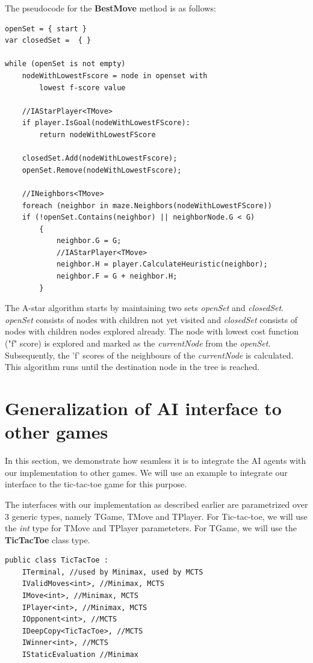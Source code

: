 The pseudocode for the \textbf{BestMove} method is as follows:

\begin{lstlisting}
openSet = { start }
var closedSet =  { }

while (openSet is not empty)
    nodeWithLowestFscore = node in openset with
        lowest f-score value

    //IAStarPlayer<TMove>
    if player.IsGoal(nodeWithLowestFScore):
        return nodeWithLowestFScore

    closedSet.Add(nodeWithLowestFscore);
    openSet.Remove(nodeWithLowestFscore);
    
    //INeighbors<TMove>
    foreach (neighbor in maze.Neighbors(nodeWithLowestFScore))
    if (!openSet.Contains(neighbor) || neighborNode.G < G)
        {
            neighbor.G = G;
            //IAStarPlayer<TMove>
            neighbor.H = player.CalculateHeuristic(neighbor);
            neighbor.F = G + neighbor.H;
        }
\end{lstlisting}

The A-star algorithm starts by maintaining two sets \textit{openSet} and \textit{closedSet}. \textit{openSet} consists of nodes with children not yet visited and \textit{closedSet} consists of nodes with children nodes explored already. The node with lowest cost function ("f" score) is explored and marked as the \textit{currentNode} from the \textit{openSet}. Subsequently, the 'f' scores of the neighbours of the \textit{currentNode} is calculated. This algorithm runs until the destination node in the tree is reached.

\section{Generalization of AI interface to other games}
\label{TicTacToe}

In this section, we demonstrate how seamless it is to integrate the \gls{AI} agents with our implementation to other games. We will use an example to integrate our interface to the tic-tac-toe game for this purpose.

The interfaces with our implementation as described earlier  are parametrized over 3 generic types, namely TGame, TMove and TPlayer. For Tic-tac-toe, we will use the \textit{int} type for TMove and TPlayer parameteters. For TGame, we will use the \textbf{TicTacToe} class type.

\begin{lstlisting}
public class TicTacToe :
    ITerminal, //used by Minimax, used by MCTS
    IValidMoves<int>, //Minimax, MCTS
    IMove<int>, //Minimax, MCTS
    IPlayer<int>, //Minimax, MCTS
    IOpponent<int>, //MCTS
    IDeepCopy<TicTacToe>, //MCTS
    IWinner<int>, //MCTS
    IStaticEvaluation //Minimax
\end{lstlisting}

